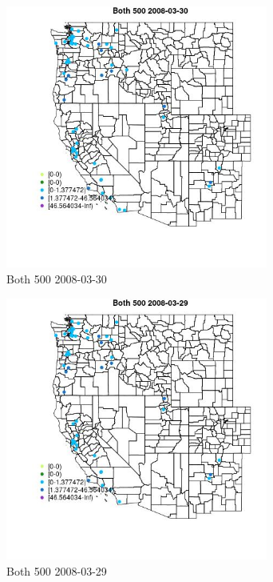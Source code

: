 \begin{figure} 
\centering  
\includegraphics[width=0.77\textwidth]{Code_Outputs/Report_ML_input_PM25_Step4_part_e_de_duplicated_aves_MapObsBoth_5002008-03-30.jpg} 
\caption{\label{fig:Report_ML_input_PM25_Step4_part_e_de_duplicated_avesMapObsBoth_5002008-03-30}Both 500 2008-03-30} 
\end{figure} 
 

\clearpage 

\begin{figure} 
\centering  
\includegraphics[width=0.77\textwidth]{Code_Outputs/Report_ML_input_PM25_Step4_part_e_de_duplicated_aves_MapObsBoth_5002008-03-29.jpg} 
\caption{\label{fig:Report_ML_input_PM25_Step4_part_e_de_duplicated_avesMapObsBoth_5002008-03-29}Both 500 2008-03-29} 
\end{figure} 
 

